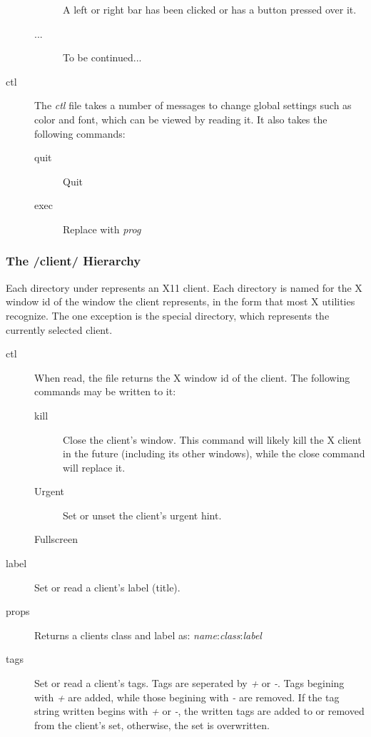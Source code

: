 \begin{description}
\begin{description}
		A left or right bar has been clicked or has a
		button pressed over it.
	\item[...] To be continued...
	\end{description}
\item[ctl] The \emph{ctl} file takes a number of messages to
	change global settings such as color and font, which can
	be viewed by reading it. It also takes the following
	commands:
	\begin{description}
	\item[quit] Quit 
	\item[exec ] Replace  with
		\emph{prog}
	\end{description}
\end{description}

\subsubsection{The /client/ Hierarchy}

Each directory under  represents an X11 client.
Each directory is named for the X window id of the window the
client represents, in the form that most X utilities recognize.
The one exception is the special  directory, which
represents the currently selected client.

\begin{description}
\item[ctl] When read, the  file returns the X window id
	of the client. The following commands may be written to
	it:
	\begin{description}
	\item[kill] Close the client's window. This command will
		likely kill the X client in the future
		(including its other windows), while the close
		command will replace it.
	\item[Urgent] Set or unset the client's urgent
		hint.
	\item[Fullscreen]

	\end{description}
\item[label] Set or read a client's label (title).
\item[props] Returns a clients class and label as:
	\emph{name}:\emph{class}:\emph{label}
\item[tags] Set or read a client's tags. Tags are seperated by
	\emph{+} or \emph{-}. Tags begining with \emph{+} are
	added, while those begining with \emph{-} are removed.
	If the tag string written begins with \emph{+} or
	\emph{-}, the written tags are added to or removed from
	the client's set, otherwise, the set is overwritten.
\end{description}

